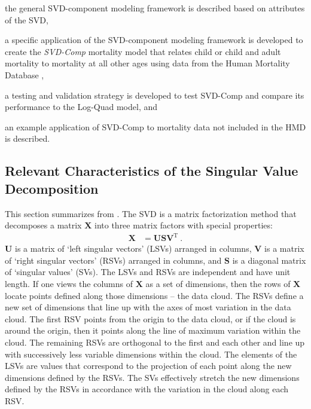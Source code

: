 \documentclass[11pt]{article}
\newcommand{\mbf}{\mathbf}
\begin{document}
\begin{enumerate*}[label=\arabic*)]
\item the general SVD-component modeling framework is described based on attributes of the SVD, 
\item a specific application of the SVD-component modeling framework is developed to create the \textit{SVD-Comp} mortality model that relates child or child and adult mortality to mortality at all other ages using data from the Human Mortality Database \citep{hmd2016},
\item a testing and validation strategy is developed to test SVD-Comp and compare its performance to the Log-Quad model, and 
\item an example application of SVD-Comp to mortality data not included in the HMD is described.
\end{enumerate*}


\subsection{Relevant Characteristics of the Singular Value Decomposition}

This section summarizes from \cite{clark2015singular}.  The SVD \citep[e.g.][]{good1969some, stewart1993early,strang2009introduction} is a matrix factorization method that decomposes a matrix $\mbf{X}$ into three matrix factors with special properties: %
%
\begin{align}
\mbf{X}
&=%
\mbf{USV}^\text{T} \ .
\label{eq:svd}
\end{align}
$\mbf{U}$ is a matrix of `left singular vectors' (LSVs) arranged in columns, $\mbf{V}$ is a matrix of `right singular vectors' (RSVs) arranged in columns, and $\mbf{S}$ is a diagonal matrix of `singular values' (SVs).  The LSVs and RSVs are independent and have unit length.  If one views the columns of $\mbf{X}$ as  a set of dimensions, then the rows of $\mbf{X}$ locate points defined along those dimensions -- the data cloud.  The RSVs define a new set of dimensions that line up with the axes of most variation in the data cloud.  The first RSV points from the origin to the data cloud, or if the cloud is around the origin, then it points along the line of maximum variation within the cloud.  The remaining RSVs are orthogonal to the first and each other and line up with successively less variable dimensions within the cloud.  The elements of the LSVs are values that correspond to the projection of each point along the new dimensions defined by the RSVs.  The SVs effectively stretch the new dimensions defined by the RSVs in accordance with the variation in the cloud along each RSV.  
\end{document}
